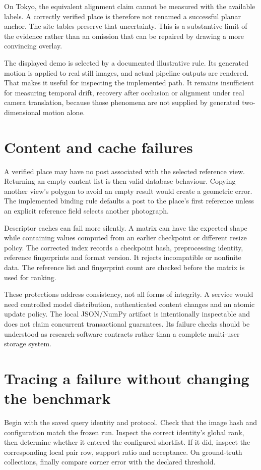 On Tokyo, the equivalent alignment claim cannot be measured with the available labels. A correctly verified place is therefore not renamed a successful planar anchor. The site tables preserve that uncertainty. This is a substantive limit of the evidence rather than an omission that can be repaired by drawing a more convincing overlay.

The displayed demo is selected by a documented illustrative rule. Its generated motion is applied to real still images, and actual pipeline outputs are rendered. That makes it useful for inspecting the implemented path. It remains insufficient for measuring temporal drift, recovery after occlusion or alignment under real camera translation, because those phenomena are not supplied by generated two-dimensional motion alone.

\section{Content and cache failures}
A verified place may have no post associated with the selected reference view. Returning an empty content list is then valid database behaviour. Copying another view's polygon to avoid an empty result would create a geometric error. The implemented binding rule defaults a post to the place's first reference unless an explicit reference field selects another photograph.

Descriptor caches can fail more silently. A matrix can have the expected shape while containing values computed from an earlier checkpoint or different resize policy. The corrected index records a checkpoint hash, preprocessing identity, reference fingerprints and format version. It rejects incompatible or nonfinite data. The reference list and fingerprint count are checked before the matrix is used for ranking.

These protections address consistency, not all forms of integrity. A service would need controlled model distribution, authenticated content changes and an atomic update policy. The local JSON/NumPy artifact is intentionally inspectable and does not claim concurrent transactional guarantees. Its failure checks should be understood as research-software contracts rather than a complete multi-user storage system.

\section{Tracing a failure without changing the benchmark}
Begin with the saved query identity and protocol. Check that the image hash and configuration match the frozen run. Inspect the correct identity's global rank, then determine whether it entered the configured shortlist. If it did, inspect the corresponding local pair row, support ratio and acceptance. On ground-truth collections, finally compare corner error with the declared threshold.

